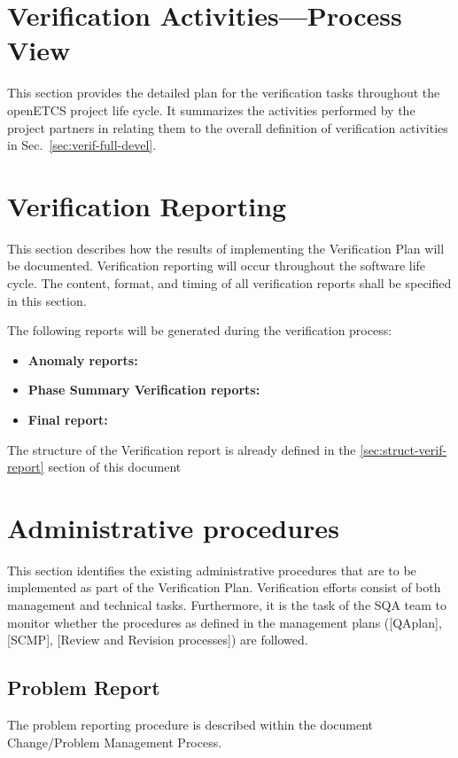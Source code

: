 \section{Verification Activities---Process View}
\label{sec:verif-activ-proce}
This section provides the detailed plan for the verification tasks
throughout the openETCS project life cycle. It summarizes the
activities performed by the project partners in relating them to the
overall definition of verification activities in
Sec.~\ref{sec:verif-full-devel}. 

\section{Verification Reporting}
This section describes how the results of implementing the
Verification Plan will be documented.  Verification reporting will
occur throughout the software life cycle.  The content, format, and
timing of all verification reports shall be specified in this section.



The following reports will be generated during the verification process:
\begin{itemize}
\item \textbf{Anomaly reports:} 
\item \textbf{Phase Summary Verification reports:} 
\item \textbf{Final report:}
\end{itemize}

The structure of the Verification report is already defined in the
\ref{sec:struct-verif-report} section of this document 

\section{Administrative procedures}
This section identifies the existing administrative procedures that
are to be implemented as part of the Verification Plan. 
Verification efforts consist of both management and technical tasks.
Furthermore, it is the task of the SQA team to monitor whether the
procedures as defined in the management plans ([QAplan], [SCMP],
[Review and Revision processes]) are followed. 

\subsection{Problem Report}
The problem reporting procedure is described within the document
Change/Problem Management Process.

